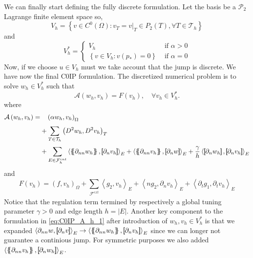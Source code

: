 We can finally start defining the fully discrete formulation. Let the basis be a $\mathcal{P}_{2} $ Lagrange finite element space so,
\[
V_{h} = \left\{ v \in C^{0}\left( \Omega  \right): v_{T} = v | _{T} \in P_{2}\left( T \right), \forall T \in
\mathcal{T}_{h}    \right\}
\]
and
\[
V_{h}^{*} = \begin{cases}
    V_{h} & \text{ if } \alpha  > 0 \\
    \left\{ v \in V_{h}: v\left( p_{*}  \right) = 0   \right\} &  \text{ if } \alpha   = 0
\end{cases}
\]
Now, if we choose $u \in V_{h}$ must we take account that the jump is discrete.
 We have now the final C0IP formulation.
The discretized numerical problem is to solve $w_{h} \in V_{h}^{*}$ such that
\begin{equation}
\label{eq:C0IP_A_F}
\mathcal{A}\left( w_{h}, v_{h} \right)   = F\left( v_{h} \right), \quad \forall v_{h} \in V_{h}^{*}  .
\end{equation}
where
\begin{equation}
\label{eq:C0IP_A_h_1}
\begin{split}
\mathcal{A} \left( w_{h}, v_{h} \right)   =&
  \quad  \left( \alpha  w_{h}, v_{h} \right) _{\Omega }\\
&  + \sum_{T \in \mathcal{T} _{h}}^{} \left( D^2 w_{h}, D^2v_{h} \right) _{T} \\
 & +
  \sum_{E \in \mathcal{F}_{h}^{int} }^{}
  \left< \mean{  \partial _{n n} w_{h} }, \jump{ \partial _{n }v_{h}} \right>_{E}  +
 \left< \mean{ \partial _{n n} v_{h} }, \jump{ \partial _{n}w }      \right>_{E}
+ \frac{\gamma}{h}  \left< \jump{ \partial _{n} w_{h}}, \jump{ \partial _{n} v_{h}   }   \right>_{E}
\end{split}
\end{equation}
and
\begin{equation}
\label{eq:C0IP_F_h}
F\left( v_{h} \right)  = \left( f, v_{h} \right) _{\Omega } +  \sum_ {\mathcal{F} ^{ext}_{}}^{} \left<g_{2 }, v_{h}  \right> _{E}
+ \left<n g_{2}, \partial  _{n}v_{h} \right>_{E} + \left<\partial _{t} g_{1} , \partial _{t}v_{h} \right>_{E}
\end{equation}
Notice that the regulation term termined by respectively a global tuning parameter $\gamma >0 $ and edge length $h = \left\lvert E \right\rvert $. Another key component to the formulation
in \eqref{eq:C0IP_A_h_1} after introduction of $ w_{h}, v_{h} \in V^{*}_{h}$  is that we expanded $\left< \partial _{nn}w, \jump{ \partial _{n} v }  \right>_{E} \to \left< \mean{ \partial _{nn}w_{h} }  , \jump{ \partial _{n} v_{h} }  \right>_{E} $ since we can longer not guarantee a
continious jump. For symmetric purposes we also added $ \left< \mean{ \partial _{nn} v_{h}}  , \jump{ \partial _{n} w_{h} }  \right>_{E} $.

